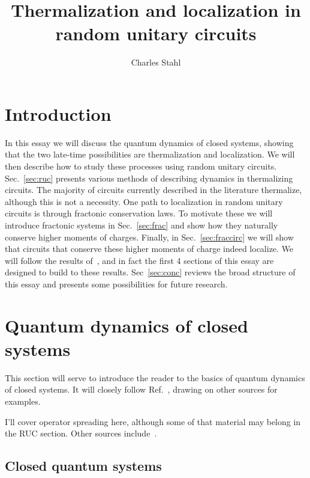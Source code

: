 \documentclass[a4paper,12pt]{article}
\title{Thermalization and localization in random unitary circuits}
\author{Charles Stahl}
\newcommand{\note}[1]{{\color{red}{#1}}}
\begin{document}
\maketitle

\section{Introduction} \label{sec:intro}

In this essay we will discuss the quantum dynamics of closed systems, showing that the two late-time possibilities are thermalization and localization. We will then describe how to study these processes using random unitary circuits. Sec.~\ref{sec:ruc} presents various methods of describing dynamics in thermalizing circuits. The majority of circuits currently described in the literature thermalize, although this is not a necessity. One path to localization in random unitary circuits is through fractonic conservation laws. To motivate these we will introduce fractonic systems in Sec.~\ref{sec:frac} and show how they naturally conserve higher moments of charges. Finally, in Sec.~\ref{sec:fraccirc} we will show that circuits that conserve these higher moments of charge indeed localize. We will follow the results of~\cite{PaiFracton}, and in fact the first 4 sections of this essay are designed to build to these results. Sec~\ref{sec:conc} reviews the broad structure of this essay and presents some possibilities for future research.

\note{Include term ``scrambling, ergodic"}

\note{Always write $S_Z$ as $Z$?}


\section{Quantum dynamics of closed systems} \label{sec:dyn}

This section will serve to introduce the reader to the basics of quantum dynamics of closed systems. It will closely follow Ref.~\cite{Nandkishore14}, drawing on other sources for examples.

I'll cover operator spreading here, although some of that material may belong in the RUC section. Other sources include~\cite{GogolinStatMech, PolkovnikovClosed, Cazalilla2010}.

\subsection{Closed quantum systems} \label{sub:closed}
\end{document}

